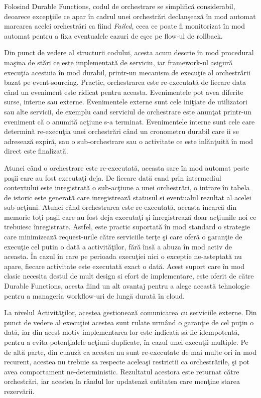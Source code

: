 \documentclass[a4paper,12pt]{report}
\begin{document}
\par Folosind Durable Functions, codul de orchestrare se simplifică considerabil, deoarece excepţiile ce apar în cadrul unei orchestrări declanşează în mod automat marcarea acelei orchestrări ca fiind \emph{Failed}, ceea ce poate fi monitorizat în mod automat pentru a fixa eventualele cazuri de eşec pe flow-ul de rollback. 
\par Din punct de vedere al structurii codului, acesta acum descrie în mod procedural maşina de stări ce este implementată de serviciu, iar framework-ul asigură execuţia acestuia în mod durabil, printr-un mecanism de execuţie al orchestrării bazat pe event-sourcing. Practic, orchestrarea este re-executată de fiecare data când un eveniment este ridicat pentru aceasta. Evenimentele pot avea diferite surse, interne sau externe. Evenimentele externe sunt cele iniţiate de utilizatori sau alte servicii, de exemplu cand serviciul de orchestrare este anunţat printr-un eveniment că o anumită acţiune s-a terminat. Evenimentele interne sunt cele care determină re-execuţia unei orchestrări când un cronometru durabil care ii se adresează expiră, sau o sub-orchestrare sau o activitate ce este inlănţuită în mod direct este finalizată. 
\par Atunci când o orchestrare este re-executată, aceasta sare în mod automat peste paşii care au fost executaţi deja. De fiecare dată cand prin intermediul contextului este inregistrată o sub-acţiune a unei orchestrări, o intrare în tabela de istoric este generată care inregistrează statusul si eventualul rezultat al acelei sub-acţiuni. Atunci când orchestrarea este re-executată, aceasta incarcă din memorie toţi paşii care au fost deja executaţi şi înregistrează doar acţiunile noi ce trebuiesc înregistrate. Astfel, este practic suportată în mod standard o strategie care minimizează request-urile către serviciile terţe şi care oferă o garanţie de execuţie cel putin o dată a activităţilor, fără însă a abuza în mod activ de aceasta. În cazul în care pe perioada execuţiei nici o exceptie ne-asteptată nu apare, fiecare activitate este executată exact o dată. Acest suport care în mod clasic necesita destul de mult design si efort de implementare, este oferit de către Durable Functions, acesta fiind un alt avantaj pentru a alege această tehnologie pentru a manageria workflow-uri de lungă durată în cloud. 
\par La nivelul Activităţilor, acestea gestionează comunicarea cu serviciile externe. Din punct de vedere al execuţiei acestea sunt rulate urmând o garanţie de cel puţin o dată, iar din acest motiv implementarea lor este indicată să fie idempotentă, pentru a evita potenţialele acţiuni duplicate, în cazul unei execuţii multiple. Pe de altă parte, din cuauză ca acestea nu sunt re-executate de mai multe ori în mod recurent, acestea nu trebuie sa respecte aceleaşi restrictii ca orchestrările, şi pot avea comportament ne-deterministic. Rezultatul acestora este returnat către orchestrări, iar acestea la rândul lor updatează entitatea care menţine starea rezervării. 
\end{document}

